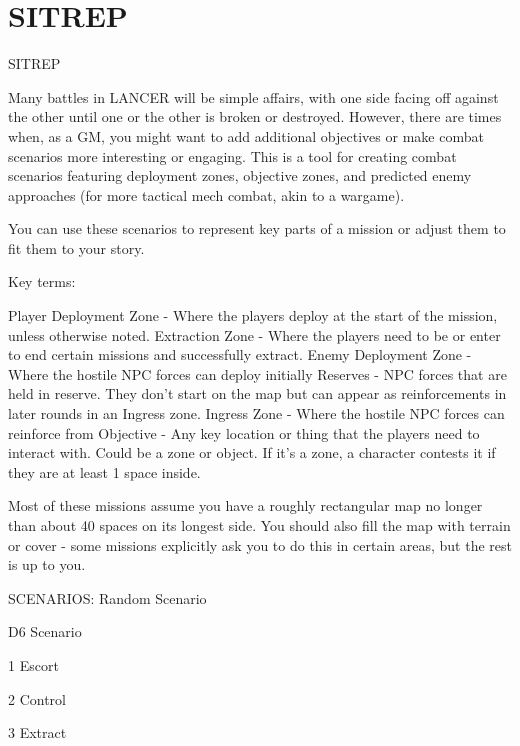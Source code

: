 \section{SITREP}


                                              SITREP   

Many battles in LANCER will be simple affairs, with one side facing off against the other until one  
or the other is broken or destroyed. However, there are times when, as a GM, you might want to  
add additional objectives or make combat scenarios more interesting or engaging. This is a tool  
for creating combat scenarios featuring deployment zones, objective zones, and predicted enemy  
approaches (for more tactical mech combat, akin to a wargame).   

You can use these scenarios to represent key parts of a mission or adjust them to fit them to your  
story.  

Key terms:  

Player Deployment Zone - Where the players deploy at the start of the mission, unless otherwise  
noted.   
Extraction Zone - Where the players need to be or enter to end certain missions and  
successfully extract.   
Enemy Deployment Zone - Where the hostile NPC forces can deploy initially  
Reserves - NPC forces that are held in reserve. They don’t start on the map but can appear as  
reinforcements in later rounds in an Ingress zone.  
Ingress Zone - Where the hostile NPC forces can reinforce from  
Objective - Any key location or thing that the players need to interact with. Could be a zone or  
object. If it’s a zone, a character contests it if they are at least 1 space inside.  

Most of these missions assume you have a roughly rectangular map no longer than about 40  
spaces on its longest side. You should also fill the map with terrain or cover - some missions  
explicitly ask you to do this in certain areas, but the rest is up to you.  

                                                SCENARIOS:  
Random Scenario
 

 D6                                                     Scenario 

 1                                                      Escort 

 2                                                      Control 

 3                                                      Extract 

